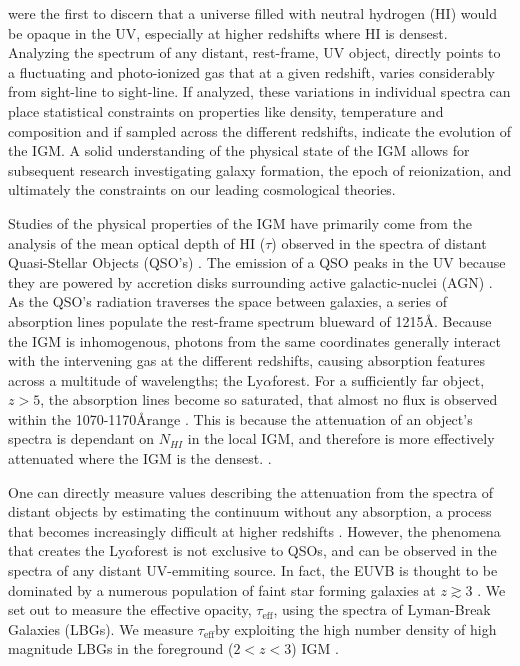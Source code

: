 \documentclass[preprint2,times,tighten]{aastex6}
\newcommand{\teff}{$\tau_\mathrm{eff}$\space}
\newcommand{\lya}{Ly$\alpha$\space}
\begin{document}
\cite{1965ApJ...142.1633G} were the first to discern that a universe filled with neutral hydrogen (HI) would be opaque in the UV, especially at higher redshifts where HI is densest. Analyzing the spectrum of any distant, rest-frame, UV object, directly points to a fluctuating and photo-ionized gas that at a given redshift, varies considerably from sight-line to sight-line. If analyzed, these variations in individual spectra can place statistical constraints on properties like density, temperature and composition and if sampled across the different redshifts, indicate the evolution of the IGM. A solid understanding of the physical state of the IGM allows for subsequent research investigating galaxy formation, the epoch of reionization, and ultimately the constraints on our leading cosmological theories.

Studies of the physical properties of the IGM have primarily come from the analysis of the mean optical depth of HI ($\tau$) observed in the spectra of distant Quasi-Stellar Objects (QSO's) \citep{prochaska_direct_2009, 2007ApJ...662...72B, faucher-giguere_direct_2008, kirkman_h_2005}. The emission of a QSO peaks in the UV because they are powered by accretion disks surrounding active galactic-nuclei (AGN) \citep{meiksin_physics_2009}. As the QSO's radiation traverses the space between galaxies, a series of absorption lines populate the rest-frame spectrum blueward of 1215\AA. Because the IGM is inhomogenous, photons from the same coordinates generally interact with the intervening gas at the different redshifts, causing absorption features across a multitude of wavelengths; the \lya forest. For a sufficiently far object, $z > 5$, the absorption lines become so saturated, that almost no flux is observed within the 1070-1170\AA \space range \citep{prochaska_hi_nodate}. This is because the attenuation of an object's spectra is dependant on $N_{HI}$ in the local IGM, and therefore is more effectively attenuated where the IGM is the densest. \citep{mcdonald_lyman-alpha_2006}. 

One can directly measure values describing the attenuation from the spectra of distant objects by estimating the continuum without any absorption, a process that becomes increasingly difficult at higher redshifts \citep{kirkman_h_2005}. However, the phenomena that creates the \lya forest is not exclusive to QSOs, and can be observed in the spectra of any distant UV-emmiting source. In fact, the EUVB is thought to be dominated by a numerous population of faint star forming galaxies at $z \gtrsim 3$ \citep{prochaska_direct_2009}. We set out to measure the effective opacity, \teff, using the spectra of Lyman-Break Galaxies (LBGs). We measure \teff by exploiting the high number density of high magnitude LBGs in the foreground ($2 <z< 3$) IGM \citep{lee_first_2018}. 
\end{document}
